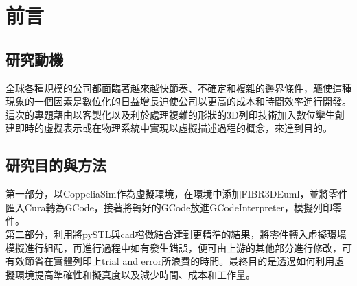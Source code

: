 \chapter{前言}
\renewcommand{\baselinestretch}{10.0} %
\setcounter{page}{1}  %
\fontsize{14pt}{2.5pt}\sectionef
\section{研究動機}
全球各種規模的公司都面臨著越來越快節奏、不確定和複雜的邊界條件，驅使這種現象的一個因素是數位化的日益增長迫使公司以更高的成本和時間效率進行開發。這次的專題藉由以客製化以及利於處理複雜的形狀的3D列印技術加入數位孿生創建即時的虛擬表示或在物理系統中實現以虛擬描述過程的概念，來達到目的。\\

\section{研究目的與方法}
第一部分，以CoppeliaSim作為虛擬環境，在環境中添加FIBR3DEuml，並將零件匯入Cura轉為GCode，接著將轉好的GCode放進GCodeInterpreter，模擬列印零件。\\

第二部分，利用將pySTL與cad檔做結合達到更精準的結果，將零件轉入虛擬環境模擬進行組配，再進行過程中如有發生錯誤，便可由上游的其他部分進行修改，可有效節省在實體列印上trial and error所浪費的時間。最終目的是透過如何利用虛擬環境提高準確性和擬真度以及減少時間、成本和工作量。\\

\renewcommand{\baselinestretch}{0.5} %